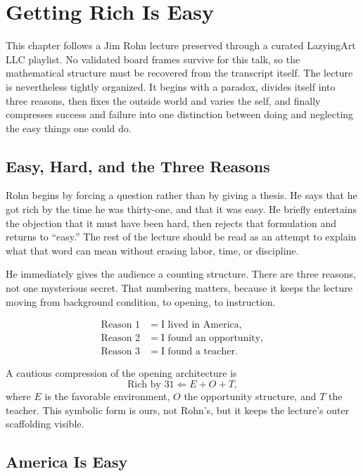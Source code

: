 \chapter{Getting Rich Is Easy}

This chapter follows a Jim Rohn lecture preserved through a curated LazyingArt LLC playlist. No validated board frames survive for this talk, so the mathematical structure must be recovered from the transcript itself. The lecture is nevertheless tightly organized. It begins with a paradox, divides itself into three reasons, then fixes the outside world and varies the self, and finally compresses success and failure into one distinction between doing and neglecting the easy things one could do.

\section{Easy, Hard, and the Three Reasons}

Rohn begins by forcing a question rather than by giving a thesis. He says that he got rich by the time he was thirty-one, and that it was easy. He briefly entertains the objection that it must have been hard, then rejects that formulation and returns to ``easy.'' The rest of the lecture should be read as an attempt to explain what that word can mean without erasing labor, time, or discipline.

He immediately gives the audience a counting structure. There are three reasons, not one mysterious secret. That numbering matters, because it keeps the lecture moving from background condition, to opening, to instruction.

\begin{align}
\text{Reason 1} &= \text{I lived in America},\\
\text{Reason 2} &= \text{I found an opportunity},\\
\text{Reason 3} &= \text{I found a teacher}.
\end{align}

A cautious compression of the opening architecture is
\begin{equation}
\text{Rich by }31 \Longleftarrow E + O + T,
\end{equation}
where \(E\) is the favorable environment, \(O\) the opportunity structure, and \(T\) the teacher. This symbolic form is ours, not Rohn's, but it keeps the lecture's outer scaffolding visible.

\section{America Is Easy}

